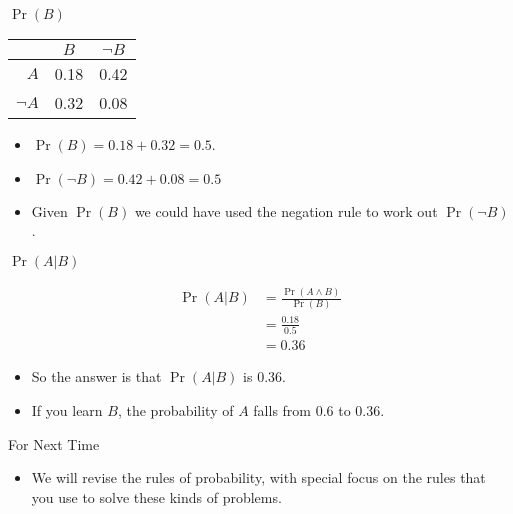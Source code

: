 \documentclass[
  ignorenonframetext,
]{beamer}
\providecommand{\tightlist}{%
  \setlength{\itemsep}{0pt}\setlength{\parskip}{0pt}}
\renewcommand{\,}{\text{, }}
\begin{document}
\begin{frame}{\(\Pr(B)\)}
\protect\hypertarget{prb}{}

\begin{longtable}[]{@{}rcc@{}}
\toprule
& \(B\) & \(\neg B\)\tabularnewline
\midrule
\endhead
\(A\) & 0.18 & 0.42\tabularnewline
\(\neg A\) & 0.32 & 0.08\tabularnewline
\bottomrule
\end{longtable}

\begin{itemize}
\tightlist
\item
  \(\Pr(B) = 0.18 + 0.32 = 0.5\). \pause
\item
  \(\Pr(\neg B) = 0.42 + 0.08 = 0.5\) \pause
\item
  Given \(\Pr(B)\) we could have used the negation rule to work out
  \(\Pr(\neg B)\).
\end{itemize}

\end{frame}

\begin{frame}{\(\Pr(A | B)\)}
\protect\hypertarget{pra-b}{}

\begin{align*}
\Pr(A | B) &= \frac{\Pr(A \wedge B)}{\Pr(B)} \\
 &= \frac{0.18}{0.5} \\
 &= 0.36
\end{align*}

\begin{itemize}
\tightlist
\item
  So the answer is that \(\Pr(A | B)\) is 0.36.
\item
  If you learn \(B\), the probability of \(A\) falls from 0.6 to 0.36.
\end{itemize}

\end{frame}

\begin{frame}{For Next Time}
\protect\hypertarget{for-next-time}{}

\begin{itemize}
\tightlist
\item
  We will revise the rules of probability, with special focus on the
  rules that you use to solve these kinds of problems.
\end{itemize}

\end{frame}
\end{document}
